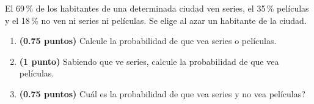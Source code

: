 
El 69\,\% de los habitantes de una determinada ciudad ven series, el 35\,\% películas y el 18\,\% no ven ni series ni películas. Se elige al azar un habitante de la ciudad.
\begin{enumerate}[label=\alph*),leftmargin=2.4em]
  \item \textbf{(0.75 puntos)} Calcule la probabilidad de que vea series o películas.
  \item \textbf{(1 punto)} Sabiendo que ve series, calcule la probabilidad de que vea películas.
  \item \textbf{(0.75 puntos)} \textquestiondown{}Cuál es la probabilidad de que vea series y no vea películas?
\end{enumerate}
